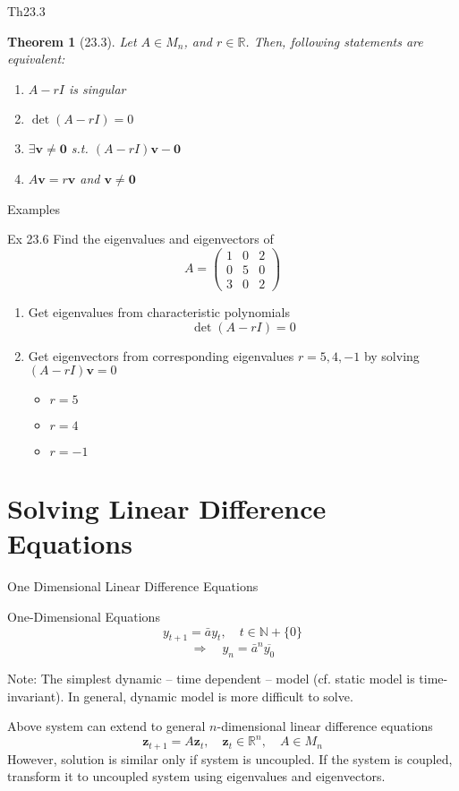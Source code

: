 \documentclass[final]{beamer}
\newtheorem{thm}{Theorem}
\newcommand{\bb}{\mathbb}
\newcommand{\bd}{\mathbf}
\begin{document}
\begin{frame}[t]{Th23.3}
	\begin{thm}
		[23.3] Let $A\in M_n$, and $r\in\bb{R}$. Then, following statements are equivalent:
		\begin{enumerate}
			\item $A-rI$ is singular
			\item $\det(A-rI)=0$
			\item $\exists \bd{v}\neq\bd{0}$ s.t. $(A-rI)\bd{v}-\bd{0}$
			\item $A\bd{v}=r\bd{v}$ and $\bd{v}\neq \bd{0}$
		\end{enumerate}
	\end{thm}
\end{frame}

\begin{frame}[t]{Examples}
	\begin{block}
		{Ex 23.6} Find the eigenvalues and eigenvectors of \[
			A = \begin{pmatrix}
				1&0&2\\
				0&5&0\\
				3&0&2
			\end{pmatrix}
		\]
		\begin{enumerate}[Step 1)]
			\item Get eigenvalues from characteristic polynomials
			\[
				\det (A-rI) = 0
			\]
			\item Get eigenvectors from corresponding eigenvalues $r=5,4,-1$ by solving $(A-rI)\bd{v}=0$
			\begin{itemize}
				\item $r=5$
				\item $r=4$
				\item $r=-1$
			\end{itemize}
		\end{enumerate}
	\end{block}
\end{frame}

\section{Solving Linear Difference Equations} %
\label{sec:solving_linear_difference_equations}
\begin{frame}[t]{One Dimensional Linear Difference Equations}
	\begin{block}
		{One-Dimensional Equations}
		\[
			y_{t+1} = \bar{a}y_t, \quad t\in \bb{N}+\{0\}
		\]
		\[
			\Rightarrow\quad y_n = \bar{a}^n \overline{y_0}
		\]
	\end{block}
	Note: The simplest dynamic -- time dependent -- model (cf. static model is time-invariant). In general, dynamic model is more difficult to solve.
	
	Above system can extend to general $n$-dimensional linear difference equations\[
		\bd{z}_{t+1}=A\bd{z}_t, \quad \bd{z}_t\in \bb{R}^n,\quad A\in M_n
	\]
	However, solution is similar only if system is uncoupled. If the system is coupled, transform it to uncoupled system using eigenvalues and eigenvectors. 
\end{frame}
\end{document}
